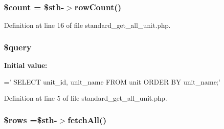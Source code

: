 \hypertarget{standard__get__all__unit_8php_af789423037bbc89dc7c850e761177570}{
\subsubsection[{\$count}]{\setlength{\rightskip}{0pt plus 5cm}\$count = \$sth-\/$>$row\-Count()}}\label{standard__get__all__unit_8php_af789423037bbc89dc7c850e761177570}


Definition at line 16 of file standard\-\_\-get\-\_\-all\-\_\-unit.\-php.

\hypertarget{standard__get__all__unit_8php_af59a5f7cd609e592c41dc3643efd3c98}{
\subsubsection[{\$query}]{\setlength{\rightskip}{0pt plus 5cm}\$query}}\label{standard__get__all__unit_8php_af59a5f7cd609e592c41dc3643efd3c98}
{\bfseries Initial value\-:}
\begin{DoxyCode}
=\textcolor{stringliteral}{'}
\textcolor{stringliteral}{    SELECT }
\textcolor{stringliteral}{        unit\_id,}
\textcolor{stringliteral}{        unit\_name}
\textcolor{stringliteral}{    FROM }
\textcolor{stringliteral}{        unit}
\textcolor{stringliteral}{    ORDER BY}
\textcolor{stringliteral}{        unit\_name;'}
\end{DoxyCode}


Definition at line 5 of file standard\-\_\-get\-\_\-all\-\_\-unit.\-php.

\hypertarget{standard__get__all__unit_8php_ace2ec39e7df3899fa8df9640ec274b03}{
\subsubsection[{\$rows}]{\setlength{\rightskip}{0pt plus 5cm}\$rows =\$sth-\/$>$fetch\-All()}}\label{standard__get__all__unit_8php_ace2ec39e7df3899fa8df9640ec274b03}


